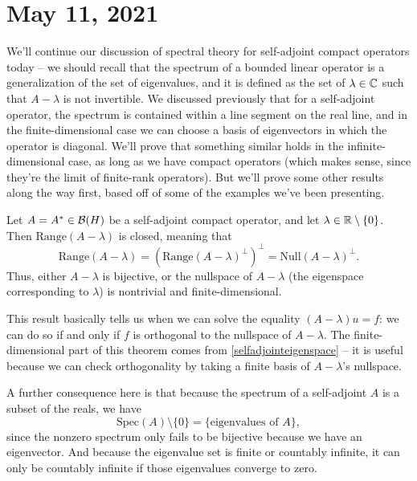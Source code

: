 \pagebreak\section{May 11, 2021}

We'll continue our discussion of spectral theory for self-adjoint compact operators today -- we should recall that the spectrum of a bounded linear operator is a generalization of the set of eigenvalues, and it is defined as the set of $\lambda \in \mathbb C$ such that $A - \lambda$ is not invertible. We discussed previously that for a self-adjoint operator, the spectrum is contained within a line segment on the real line, and in the finite-dimensional case we can choose a basis of eigenvectors in which the operator is diagonal. We'll prove that something similar holds in the infinite-dimensional case, as long as we have compact operators (which makes sense, since they're the limit of finite-rank operators). But we'll prove some other results along the way first, based off of some of the examples we've been presenting.

\begin{theorem}
Let $A = A^\ast \in \mathcal{B}(H)$ be a self-adjoint compact operator, and let $\lambda \in \mathbb R \setminus \{0\}$. Then $\text{Range}(A - \lambda)$ is closed, meaning that
\[
    \text{Range}(A - \lambda) = (\text{Range}(A-\lambda)^\perp)^\perp = \text{Null}(A - \lambda)^\perp.
\]
Thus, either $A - \lambda$ is bijective, or the nullspace of $A - \lambda$ (the eigenspace corresponding to $\lambda$) is nontrivial and finite-dimensional.
\end{theorem}

This result basically tells us when we can solve the equality $(A - \lambda)u = f$: we can do so if and only if $f$ is orthogonal to the nullspace of $A - \lambda$. The finite-dimensional part of this theorem comes from \cref{selfadjointeigenspace} -- it is useful because we can check orthogonality by taking a finite basis of $A - \lambda$'s nullspace. 

A further consequence here is that because the spectrum of a self-adjoint $A$ is a subset of the reals, we have
\[
    \text{Spec}(A) \setminus \{0\} = \{\text{eigenvalues of }A\},
\]
since the nonzero spectrum only fails to be bijective because we have an eigenvector. And because the eigenvalue set is finite or countably infinite, it can only be countably infinite if those eigenvalues converge to zero. 

